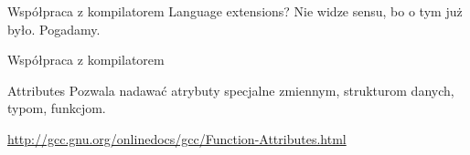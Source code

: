 \begin{frame}[fragile]{Współpraca z kompilatorem}
	Language extensions? Nie widze sensu, bo o tym już było. Pogadamy.
\end{frame}
\begin{frame}[fragile]{Współpraca z kompilatorem}
	\begin{block}{Attributes}
		Pozwala nadawać atrybuty specjalne zmiennym, strukturom danych, typom, funkcjom.
		\begin{itemize}
			\item \verb*%int x __attribute__((aligned(16)))=0;% //zmienna
			\item \verb*%int x[2] __attribute__ ((packed));% //jako czesc struktury %
			\item \verb*%typedef int more_aligned_int %
			\verb*%__attribute__ ((aligned (8)));% //typ %
			\item \verb*%int old_fn () __attribute__ ((fastcall));% //funkcja
			\item \verb*%void fatal () __attribute__ ((noreturn));%
		\end{itemize}
		\url{http://gcc.gnu.org/onlinedocs/gcc/Function-Attributes.html}
	\end{block}
\end{frame}